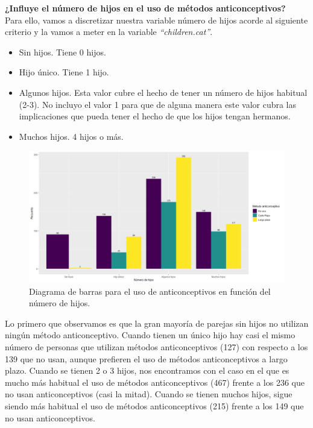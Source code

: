 \documentclass[a4paper,12pt, oneside]{book}
\begin{document}
\textbf{¿Influye el número de hijos en el uso de métodos anticonceptivos?}\\

Para ello, vamos a discretizar nuestra variable número de hijos acorde al siguiente criterio y la vamos a meter en la variable \textit{``children.cat''}.

\begin{itemize}
	\item Sin hijos. Tiene 0 hijos.
	\item Hijo único. Tiene 1 hijo.
	\item Algunos hijos. Esta valor cubre el hecho de tener un número de hijos habitual (2-3). No incluyo el valor 1 para que de alguna manera este valor cubra las implicaciones que pueda tener el hecho de que los hijos tengan hermanos.
	\item Muchos hijos. 4 hijos o más.
\end{itemize}

\begin{figure}[H]
\centering
\includegraphics[scale=0.5]{images/hipo3.png}
\caption{Diagrama de barras para el uso de anticonceptivos en función del número de hijos.}
\end{figure}

Lo primero que observamos es que la gran mayoría de parejas sin hijos no utilizan ningún método anticonceptivo. Cuando tienen un único hijo 
hay casi el mismo número de personas que utilizan métodos anticonceptivos (127) con respecto a los 139 que no usan, aunque prefieren el uso de métodos anticonceptivos a largo plazo. Cuando se tienen 2 o 3 hijos, nos encontramos con el caso en el que es mucho más habitual el uso de métodos anticonceptivos (467) frente a los 236 que no usan anticonceptivos (casi la mitad). Cuando se tienen muchos hijos, sigue siendo más habitual el uso de métodos anticonceptivos (215) frente a los 149 que no usan anticonceptivos.
\end{document}
